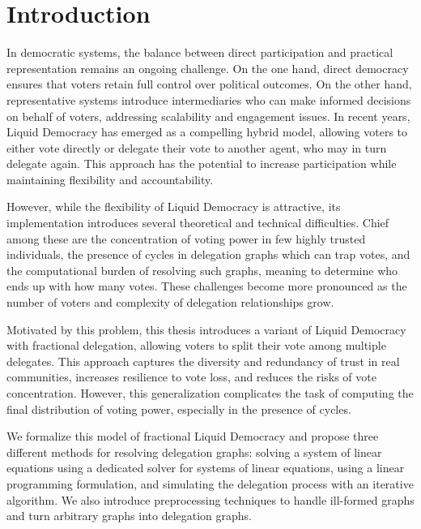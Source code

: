 
\chapter{Introduction}



In democratic systems, the balance between direct participation and practical representation remains an ongoing challenge. On the one hand, direct democracy ensures that voters retain full control over political outcomes. On the other hand, representative systems introduce intermediaries who can make informed decisions on behalf of voters, addressing scalability and engagement issues. In recent years, Liquid Democracy has emerged as a compelling hybrid model, allowing voters to either vote directly or delegate their vote to another agent, who may in turn delegate again. This approach has the potential to increase participation while maintaining flexibility and accountability.

However, while the flexibility of Liquid Democracy is attractive, its implementation introduces several theoretical and technical difficulties. Chief among these are the concentration of voting power in few highly trusted individuals, the presence of cycles in delegation graphs which can trap votes, and the computational burden of resolving such graphs, meaning to determine who ends up with how many votes. These challenges become more pronounced as the number of voters and complexity of delegation relationships grow.

Motivated by this problem, this thesis introduces a variant of Liquid Democracy with fractional delegation, allowing voters to split their vote among multiple delegates. This approach captures the diversity and redundancy of trust in real communities, increases resilience to vote loss, and reduces the risks of vote concentration. However, this generalization complicates the task of computing the final distribution of voting power, especially in the presence of cycles.

We formalize this model of fractional Liquid Democracy and propose three different methods for resolving delegation graphs: solving a system of linear equations using a dedicated solver for systems of linear equations, using a linear programming formulation, and simulating the delegation process with an iterative algorithm. We also introduce preprocessing techniques to handle ill-formed graphs and turn arbitrary graphs into delegation graphs.

